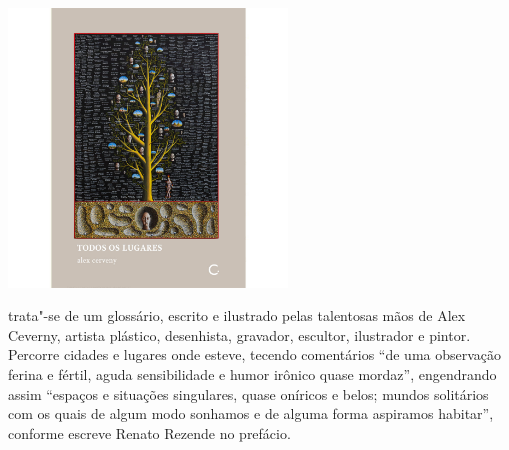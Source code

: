 \vfill

\hspace*{-.4cm}\begin{minipage}[c]{.5\linewidth}
\small{
{}}
\end{minipage}

\pagebreak %


\begin{center}
\hspace*{-3.6cm}
\hspace*{3.1cm}\includegraphics[width=74mm]{./grid/lugares.jpg}
\end{center}

\hspace*{-7cm}\hrulefill\hspace*{-7cm}

\medskip

 trata"-se de um glossário, escrito e ilustrado pelas talentosas mãos de Alex Ceverny, artista plástico, desenhista, gravador, escultor, ilustrador e pintor. Percorre cidades e lugares onde esteve, tecendo comentários “de uma observação ferina e fértil, aguda sensibilidade e humor irônico quase mordaz”, engendrando assim “espaços e situações singulares, quase oníricos e belos; mundos solitários com os quais de algum modo sonhamos e de alguma forma aspiramos habitar”, conforme escreve Renato Rezende no prefácio.

